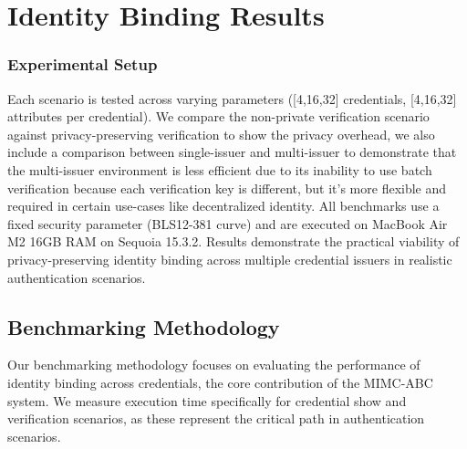 \section{Identity Binding Results}

\subsubsection*{Experimental Setup}
Each scenario is tested across varying parameters ([4,16,32] credentials, [4,16,32] attributes per credential). We compare the non-private verification scenario against privacy-preserving verification to show the privacy overhead, we also include a comparison between single-issuer and multi-issuer to demonstrate that the multi-issuer environment is less efficient due to its inability to use batch verification because each verification key is different, but it's more flexible and required in certain use-cases like decentralized identity. All benchmarks use a fixed security parameter (BLS12-381 curve) and are executed on MacBook Air M2 16GB RAM on Sequoia 15.3.2. Results demonstrate the practical viability of privacy-preserving identity binding across multiple credential issuers in realistic authentication scenarios.

\subsection{Benchmarking Methodology}

Our benchmarking methodology focuses on evaluating the performance of identity binding across credentials, the core contribution of the MIMC-ABC system. We measure execution time specifically for credential show and verification scenarios, as these represent the critical path in authentication scenarios.


